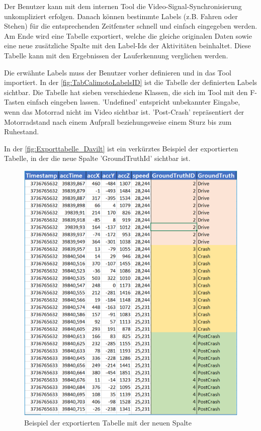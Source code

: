 Der Benutzer kann mit dem internen Tool die Video-Signal-Synchronisierung unkompliziert erfolgen. Danach können bestimmte Labels (z.B. Fahren oder Stehen) für die entsprechenden Zeitfenster schnell und einfach eingegeben werden. Am Ende wird eine Tabelle exportiert, welche die gleiche originalen Daten sowie eine neue zusätzliche Spalte mit den Label-Ids der Aktivitäten beinhaltet.
Diese Tabelle kann mit den Ergebnissen der Lauferkennung verglichen werden.

Die erwähnte Labels muss der Benutzer vorher definieren und in das Tool importiert. In der \autoref{fig:TabCalimotoLabelsID} ist die Tabelle der definierten Labels sichtbar. Die Tabelle hat sieben verschiedene Klassen, die sich im Tool mit den F-Tasten einfach eingeben lassen. 'Undefined' entspricht unbekannter Eingabe, wenn das Motorrad nicht im Video sichtbar ist. 'Post-Crash' repräsentiert der Motorradstand nach einem Aufprall beziehungsweise einem Sturz bis zum Ruhestand.
 
In der \autoref{fig:Exporttabelle_Davilt} ist ein verkürztes Beispiel der exportierten Tabelle, in der die neue Spalte 'GroundTruthId' sichtbar ist.
\begin{figure}[H]
	\centering
	\includegraphics[width=\linewidth]{Bilder/Exporttabelle_Davilt.png}
	\caption{Beispiel der exportierten Tabelle mit der neuen Spalte}
	\label{fig:Exporttabelle_Davilt}
\end{figure}


